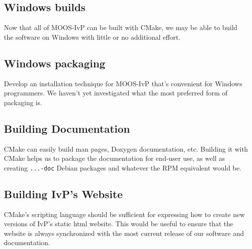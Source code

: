 \documentclass[letterpaper,10pt]{article}
\begin{document}
\subsection{Windows builds}
Now that all of MOOS-IvP can be built with CMake, we may be able to build
the software on Windows with little or no additional effort.

\subsection{Windows packaging}
Develop an installation technique for MOOS-IvP that's convenient for Windows
programmers.  We haven't yet investigated what the most preferred form of
packaging is.

\subsection{Building Documentation}
CMake can easily build man pages, Doxygen documentation, etc.  Building it
with CMake helps us to package the documentation for end-user use, as well
as creating \verb|...-doc| Debian packages and whatever the RPM equivalent
would be.

\subsection{Building IvP's Website}
CMake's scripting language should be sufficient for expressing how to create
new versions of IvP's static html website.  This would be useful to ensure that
the website is always synchronized with the most current release of our software
and documentation.
\end{document}
